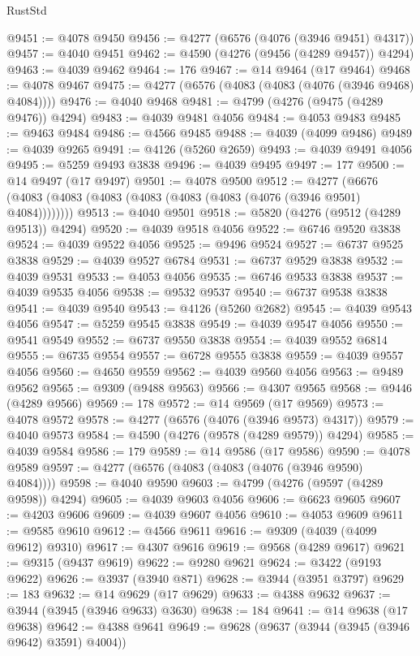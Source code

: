 \begin{lexlean}{RustStd}
\begin{coremodule}
@9451 := @4078 @9450
@9456 := @4277 (@6576 (@4076 (@3946 @9451) @4317))
@9457 := @4040 @9451
@9462 := @4590 (@4276 (@9456 (@4289 @9457)) @4294)
@9463 := @4039 @9462
@9464 := 176
@9467 := @14 @9464 (@17 @9464)
@9468 := @4078 @9467
@9475 := @4277 (@6576 (@4083 (@4083 (@4076 (@3946 @9468) @4084))))
@9476 := @4040 @9468
@9481 := @4799 (@4276 (@9475 (@4289 @9476)) @4294)
@9483 := @4039 @9481 @4056
@9484 := @4053 @9483
@9485 := @9463 @9484
@9486 := @4566 @9485
@9488 := @4039 (@4099 @9486)
@9489 := @4039 @9265
@9491 := @4126 (@5260 @2659)
@9493 := @4039 @9491 @4056
@9495 := @5259 @9493 @3838
@9496 := @4039 @9495
@9497 := 177
@9500 := @14 @9497 (@17 @9497)
@9501 := @4078 @9500
@9512 := @4277 (@6676 (@4083 (@4083 (@4083 (@4083 (@4083 (@4083 (@4076 (@3946 @9501) @4084))))))))
@9513 := @4040 @9501
@9518 := @5820 (@4276 (@9512 (@4289 @9513)) @4294)
@9520 := @4039 @9518 @4056
@9522 := @6746 @9520 @3838
@9524 := @4039 @9522 @4056
@9525 := @9496 @9524
@9527 := @6737 @9525 @3838
@9529 := @4039 @9527 @6784
@9531 := @6737 @9529 @3838
@9532 := @4039 @9531
@9533 := @4053 @4056
@9535 := @6746 @9533 @3838
@9537 := @4039 @9535 @4056
@9538 := @9532 @9537
@9540 := @6737 @9538 @3838
@9541 := @4039 @9540
@9543 := @4126 (@5260 @2682)
@9545 := @4039 @9543 @4056
@9547 := @5259 @9545 @3838
@9549 := @4039 @9547 @4056
@9550 := @9541 @9549
@9552 := @6737 @9550 @3838
@9554 := @4039 @9552 @6814
@9555 := @6735 @9554
@9557 := @6728 @9555 @3838
@9559 := @4039 @9557 @4056
@9560 := @4650 @9559
@9562 := @4039 @9560 @4056
@9563 := @9489 @9562
@9565 := @9309 (@9488 @9563)
@9566 := @4307 @9565
@9568 := @9446 (@4289 @9566)
@9569 := 178
@9572 := @14 @9569 (@17 @9569)
@9573 := @4078 @9572
@9578 := @4277 (@6576 (@4076 (@3946 @9573) @4317))
@9579 := @4040 @9573
@9584 := @4590 (@4276 (@9578 (@4289 @9579)) @4294)
@9585 := @4039 @9584
@9586 := 179
@9589 := @14 @9586 (@17 @9586)
@9590 := @4078 @9589
@9597 := @4277 (@6576 (@4083 (@4083 (@4076 (@3946 @9590) @4084))))
@9598 := @4040 @9590
@9603 := @4799 (@4276 (@9597 (@4289 @9598)) @4294)
@9605 := @4039 @9603 @4056
@9606 := @6623 @9605
@9607 := @4203 @9606
@9609 := @4039 @9607 @4056
@9610 := @4053 @9609
@9611 := @9585 @9610
@9612 := @4566 @9611
@9616 := @9309 (@4039 (@4099 @9612) @9310)
@9617 := @4307 @9616
@9619 := @9568 (@4289 @9617)
@9621 := @9315 (@9437 @9619)
@9622 := @9280 @9621
@9624 := @3422 (@9193 @9622)
@9626 := @3937 (@3940 @871)
@9628 := @3944 (@3951 @3797)
@9629 := 183
@9632 := @14 @9629 (@17 @9629)
@9633 := @4388 @9632
@9637 := @3944 (@3945 (@3946 @9633) @3630)
@9638 := 184
@9641 := @14 @9638 (@17 @9638)
@9642 := @4388 @9641
@9649 := @9628 (@9637 (@3944 (@3945 (@3946 @9642) @3591) @4004))

\end{coremodule}
\end{lexlean}
